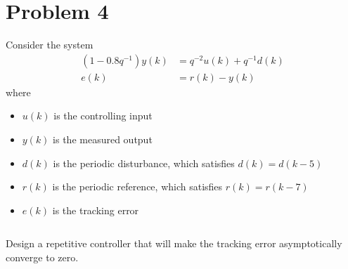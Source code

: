 \section*{Problem 4}

Consider the system
\begin{align*}
    (1-0.8q^{-1}) y(k) & = q^{-2} u(k) + q^{-1} d(k) \\
    e(k) & = r(k) - y(k)
\end{align*}
where 
\begin{itemize}
    \item
    $u(k)$ is the controlling input

    \item
    $y(k)$ is the measured output
    
    \item
    $d(k)$ is the periodic disturbance, which satisfies $d(k) = d(k-5)$
    
    \item
    $r(k)$ is the periodic reference, which satisfies $r(k) = r(k-7)$
    
    \item
    $e(k)$ is the tracking error
\end{itemize}

$\,$

\noindent
Design a repetitive controller that will make the tracking error asymptotically converge to zero.